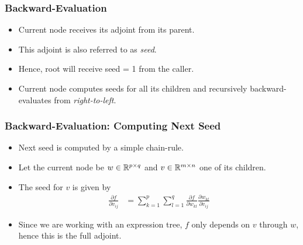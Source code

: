 \begin{frame}
\begin{figure}[t]
{

} %

\end{figure}
\end{frame}

\begin{frame}
\frametitle{Backward-Evaluation}
\begin{itemize}

\item Current node receives its adjoint from its parent.

\item This adjoint is also referred to as \emph{seed}.

\item Hence, root will receive seed = 1 from the caller.

\item Current node computes seeds for all its children and
    recursively backward-evaluates from \emph{right-to-left}.

\end{itemize}
\end{frame}

\begin{frame}
\frametitle{Backward-Evaluation: Computing Next Seed}
\begin{itemize}

\item Next seed is computed by a simple chain-rule.
\item Let the current node be $w \in \mathbb{R}^{p \times q}$ and $v \in \mathbb{R}^{m \times n}$ one of its children.
\item The seed for $v$ is given by
\begin{align}
    \frac{\partial f}{\partial v_{ij}} &=
        \sum\limits_{k=1}^p \sum\limits_{l=1}^q
        \frac{\partial f}{\partial w_{kl}} \frac{\partial w_{kl}}{\partial v_{ij}}
    \label{eq:next-adj}
\end{align}
\item Since we are working with an expression tree,
    $f$ only depends on $v$ through $w$, hence this is the full adjoint.

\end{itemize}
\end{frame}

